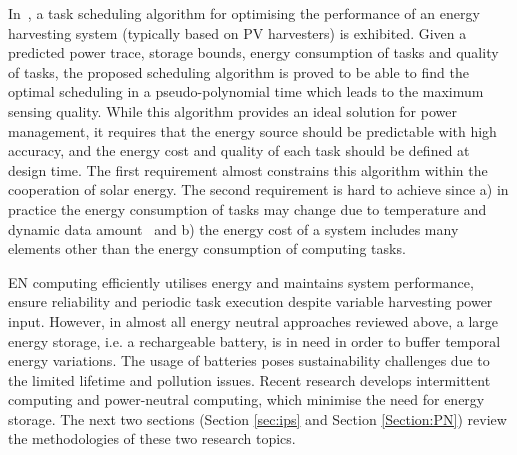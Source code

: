 In~\cite{caruso2018dynamic}, a task scheduling algorithm for optimising the performance of an energy harvesting system (typically based on PV harvesters) is exhibited. Given a predicted power trace, storage bounds, energy consumption of tasks and quality of tasks, the proposed scheduling algorithm is proved to be able to find the optimal scheduling in a pseudo-polynomial time which leads to the maximum sensing quality. While this algorithm provides an ideal solution for power management, it requires that the energy source should be predictable with high accuracy, and the energy cost and quality of each task should be defined at design time. The first requirement almost constrains this algorithm within the cooperation of solar energy. The second requirement is hard to achieve since a) in practice the energy consumption of tasks may change due to temperature and dynamic data amount~\cite{walker2016thermally} and b) the energy cost of a system includes many elements other than the energy consumption of computing tasks.

EN computing efficiently utilises energy and maintains system performance, ensure reliability and periodic task execution despite variable harvesting power input. However, in almost all energy neutral approaches reviewed above, a large energy storage, i.e. a rechargeable battery, is in need in order to buffer temporal energy variations. The usage of batteries poses sustainability challenges due to the limited lifetime and pollution issues. Recent research develops intermittent computing and power-neutral computing, which minimise the need for energy storage. The next two sections (Section \ref{sec:ips} and Section \ref{Section:PN}) review the methodologies of these two research topics. 